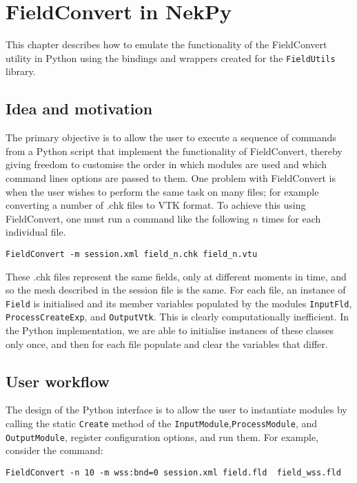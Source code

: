 \chapter{FieldConvert in NekPy}

This chapter describes how to emulate the functionality of the
FieldConvert utility in Python using the bindings and wrappers
created for the \verb+FieldUtils+ library.

\section{Idea and motivation}

The primary objective is to allow the user to execute a sequence of
commands from a Python script that implement the functionality of
FieldConvert, thereby giving freedom to customise the order in which
modules are used and which command lines options are passed to them.
One problem with FieldConvert is when the user wishes to perform the same
task on many files; for example converting a number of .chk files to VTK
format. To achieve this using FieldConvert, one must run a command like
the following $n$ times for each individual file.

\begin{lstlisting}[style=BashInputStyle]
FieldConvert -m session.xml field_n.chk field_n.vtu
\end{lstlisting}

These .chk files represent the same fields, only at different moments in
time, and so the mesh described in the session file is the same. For each
file, an instance of \verb+Field+ is initialised and its member variables
populated by the modules \verb+InputFld+, \verb+ProcessCreateExp+, and
\verb+OutputVtk+. This is clearly computationally inefficient. In the Python
implementation, we are able to initialise instances of these classes only
once, and then for each file populate and clear the variables that differ.

\section{User workflow}

The design of the Python interface is to allow the user to instantiate
modules by calling the static \verb+Create+ method of the
\verb+InputModule+,\verb+ProcessModule+, and \verb+OutputModule+,
register configuration options, and run them. For example, consider the command:

\begin{lstlisting}[style=BashInputStyle]
FieldConvert -n 10 -m wss:bnd=0 session.xml field.fld  field_wss.fld
\end{lstlisting}



